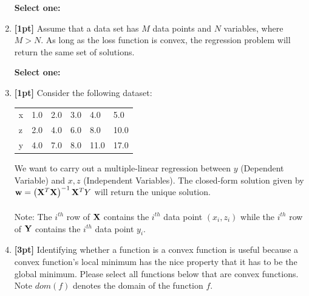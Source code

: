 \documentclass[12pt]{article}
\renewcommand{\circle}{\tikz\draw[black] (0,0) circle (1ex);}
\begin{document}
\begin{enumerate}
    \textbf{Select one:}
    
    
    \item \textbf{[1pt]} Assume that a data set has $M$ data points and $N$ variables, where $M>N$. As long as the loss function is convex, the regression problem will return the same set of solutions.
    
    \textbf{Select one:}
    
    
    \item \textbf{[1pt]} Consider the following dataset:
    \begin{table}[H]
    \centering
        \begin{tabular}{llllll}
        x & 1.0 & 2.0 & 3.0 & 4.0 & 5.0 \\
        z & 2.0 & 4.0 & 6.0 & 8.0 & 10.0 \\
        y & 4.0 & 7.0 & 8.0 & 11.0 & 17.0
        \end{tabular}
    \end{table}
    We want to carry out a multiple-linear regression between $y$ (Dependent Variable) and $x, z$ (Independent Variables). The closed-form solution given by $\mathbf{w} = \left(\mathbf{X}^T\mathbf{X}\right)^{-1}\mathbf{X}^T Y$ will return the unique solution. 
    \\~\\
    Note: The $i^{th}$ row of $\mathbf{X}$ contains the $i^{th}$ data point $(x_i,z_i)$ while the $i^{th}$ row of $\mathbf{Y}$ contains the $i^{th}$ data point $y_i$.
    
    \item \textbf{[3pt]} Identifying whether a function is a convex function is useful because a convex function's local minimum has the nice property that it has to be the global minimum. Please select all functions below that are convex functions. Note $dom(f)$ denotes the domain of the function $f$.
    

\end{enumerate}
\end{document}

